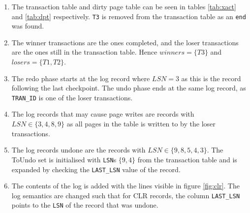 \documentclass[a4paper, 10pt]{article}
\begin{document}
\begin{enumerate}
    \item The transaction table and dirty page table can be seen in tables \ref{tab:xact}
and \ref{tab:dpt} respectively. \texttt{T3} is removed from the transaction
table as an \texttt{end} was found.
    \item The winner transactions are the ones completed, and the loser transactions
are the ones still in the transaction table. Hence $winners = \{T3\}$ and $losers =
\{T1,T2\}$.
    \item The redo phase starts at the log record where $LSN=3$ as this is the
record following the last checkpoint. The undo phase ends at the same log
record, as \texttt{TRAN\_ID} is one of the loser transactions.
    \item The log records that may cause page writes are records with
    $LSN \in \{3,4,8,9\}$ as all pages in
the table is written to by the loser transactions.
    \item The log records undone are the records with $LSN \in \{9,8,5,4,3\}$. The
    ToUndo set is initialised with \texttt{LSN}s $\{9,4\}$ from the transaction table and is
    expanded by checking the \texttt{LAST\_LSN} value of the record.
    \item The contents of the log is added with the lines visible in figure
    \ref{fig:clr}. The log semantics are changed such that for CLR records, the
    column \texttt{LAST\_LSN} points to the \texttt{LSN} of the record that was undone.
\end{enumerate}


\end{document}
